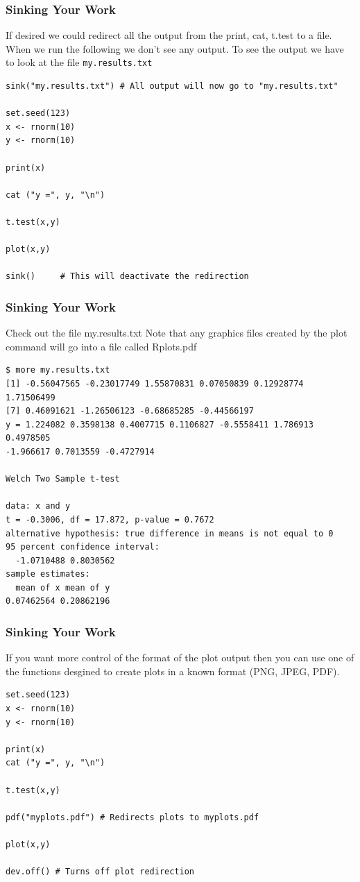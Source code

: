 \documentclass{beamer}
\begin{document}
\begin{frame}[fragile]
\frametitle{Sinking Your Work}
If desired we could redirect all the output from the print, cat, t.test to a file.
When we run the following we don't see any output. To see the output we have to look at the file \texttt{my.results.txt}

\footnotesize
\begin{verbatim}
sink("my.results.txt") # All output will now go to "my.results.txt"

set.seed(123)
x <- rnorm(10)
y <- rnorm(10)

print(x)

cat ("y =", y, "\n")

t.test(x,y)

plot(x,y)

sink()     # This will deactivate the redirection
\end{verbatim}

\end{frame}

\begin{frame}[fragile]
\frametitle{Sinking Your Work}
Check out the file my.results.txt Note that any graphics files created by the plot command will go into a file called Rplots.pdf
\footnotesize
\begin{verbatim}
$ more my.results.txt
[1] -0.56047565 -0.23017749 1.55870831 0.07050839 0.12928774 1.71506499
[7] 0.46091621 -1.26506123 -0.68685285 -0.44566197
y = 1.224082 0.3598138 0.4007715 0.1106827 -0.5558411 1.786913 0.4978505
-1.966617 0.7013559 -0.4727914

Welch Two Sample t-test

data: x and y
t = -0.3006, df = 17.872, p-value = 0.7672
alternative hypothesis: true difference in means is not equal to 0
95 percent confidence interval:
  -1.0710488 0.8030562
sample estimates:
  mean of x mean of y
0.07462564 0.20862196
\end{verbatim}
\end{frame}


\begin{frame}[fragile]
\frametitle{Sinking Your Work}
If you want more control of the format of the plot output then you can use one of the functions desgined to create plots in a known format (PNG, JPEG, PDF).
\footnotesize
\begin{verbatim}
set.seed(123)
x <- rnorm(10)
y <- rnorm(10)

print(x)
cat ("y =", y, "\n")

t.test(x,y)

pdf("myplots.pdf") # Redirects plots to myplots.pdf

plot(x,y)

dev.off() # Turns off plot redirection
\end{verbatim}
\end{frame}


\end{document}
